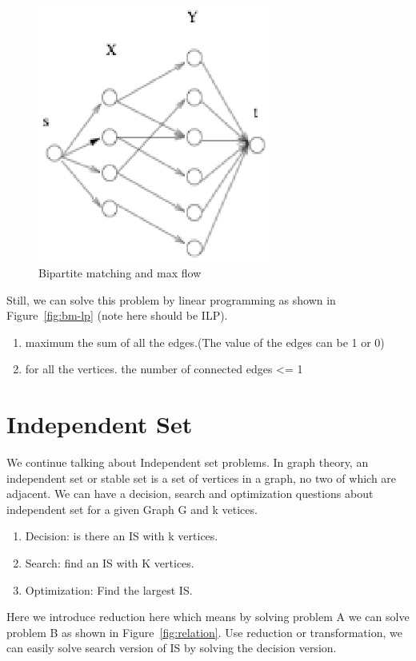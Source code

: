 \documentclass[usletter]{article}
\begin{document}
\begin{figure}[bht]
\begin{center}
     \includegraphics[width=3.0in]{figures/bm-mf}
\caption{\label{fig:bm-mf}Bipartite matching and max flow}
\end{center}
\end{figure}

Still, we can solve this problem by linear programming as shown in Figure~\ref{fig:bm-lp} (note here should be ILP).
\begin{enumerate}
	\item maximum the sum of all the edges.(The value of the edges can be 1 or 0)
	\item for all the vertices. the number of connected edges <= 1
\end{enumerate}

\section{Independent Set}
We continue talking about Independent set problems. In graph theory, an independent set or stable set is a set of vertices in a graph, no two of which are adjacent. We can have a decision, search and optimization questions about independent set for a given Graph G and k vetices.

\begin{enumerate}
	\item Decision: is there an IS with k vertices.
	\item Search: find an IS with K vertices.
	\item Optimization: Find the largest IS.
\end{enumerate}

Here we introduce reduction here which means by solving problem A we can solve problem B as shown in Figure~\ref{fig:relation}. Use reduction or transformation, we can easily solve search version of IS by solving the decision version. 
\end{document}

